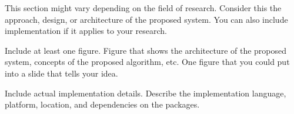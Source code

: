 This section might vary depending on the field of research. Consider this the approach, design, or architecture of the proposed system. You can also include implementation if it applies to your research.

Include at least one figure. Figure that shows the architecture of the proposed system, concepts of the proposed algorithm, etc. One figure that you could put into a slide that tells your idea. 


Include actual implementation details. 
Describe the implementation language, platform, location, and dependencies on the packages.
